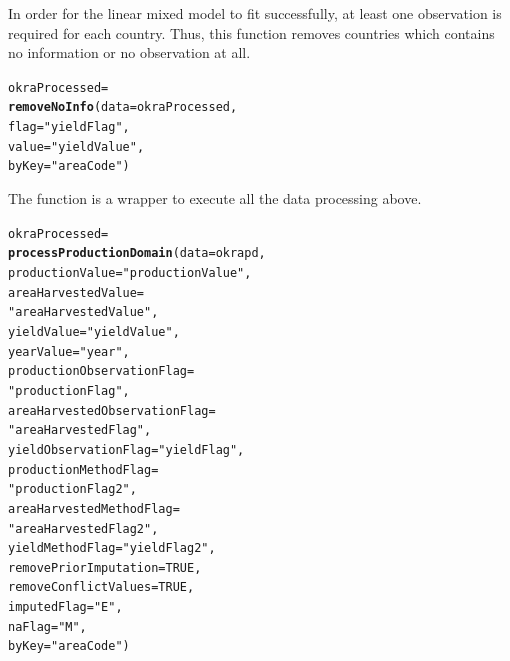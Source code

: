 \documentclass[nojss]{jss}\usepackage[]{graphicx}\usepackage[]{color}
\makeatletter
\newcommand{\hlnum}[1]{\textcolor[rgb]{0.686,0.059,0.569}{#1}}%
\newcommand{\hlstr}[1]{\textcolor[rgb]{0.192,0.494,0.8}{#1}}%
\newcommand{\hlstd}[1]{\textcolor[rgb]{0.345,0.345,0.345}{#1}}%
\newcommand{\hlkwb}[1]{\textcolor[rgb]{0.69,0.353,0.396}{#1}}%
\newcommand{\hlkwc}[1]{\textcolor[rgb]{0.333,0.667,0.333}{#1}}%
\newcommand{\hlkwd}[1]{\textcolor[rgb]{0.737,0.353,0.396}{\textbf{#1}}}%
\newenvironment{kframe}{%
 \def\at@end@of@kframe{}%
 \ifinner\ifhmode%
  \def\at@end@of@kframe{\end{minipage}}%
  \begin{minipage}{\columnwidth}%
 \fi\fi%
 \def\FrameCommand##1{\hskip\@totalleftmargin \hskip-\fboxsep
 \colorbox{shadecolor}{##1}\hskip-\fboxsep
     \hskip-\linewidth \hskip-\@totalleftmargin \hskip\columnwidth}%
 \MakeFramed {\advance\hsize-\width
   \@totalleftmargin\z@ \linewidth\hsize
   \@setminipage}}%
 {\par\unskip\endMakeFramed%
 \at@end@of@kframe}
\newenvironment{knitrout}{}{} %
\makeatother
\begin{document}
In order for the linear mixed model to fit successfully, at least one
observation is required for each country. Thus, this function removes
countries which contains no information or no observation at all.

\begin{knitrout}
\color{fgcolor}\begin{kframe}
\begin{alltt}
\hlstd{okraProcessed} \hlkwb{=}
    \hlkwd{removeNoInfo}\hlstd{(}\hlkwc{data} \hlstd{= okraProcessed,}
                 \hlkwc{flag} \hlstd{=} \hlstr{"yieldFlag"}\hlstd{,}
                 \hlkwc{value} \hlstd{=} \hlstr{"yieldValue"}\hlstd{,}
                 \hlkwc{byKey} \hlstd{=} \hlstr{"areaCode"}\hlstd{)}
\end{alltt}
\end{kframe}
\end{knitrout}


The function  is a wrapper to execute
all the data processing above.

\begin{knitrout}
\color{fgcolor}\begin{kframe}
\begin{alltt}
\hlstd{okraProcessed} \hlkwb{=}
    \hlkwd{processProductionDomain}\hlstd{(}\hlkwc{data} \hlstd{= okrapd,}
                           \hlkwc{productionValue} \hlstd{=} \hlstr{"productionValue"}\hlstd{,}
                           \hlkwc{areaHarvestedValue} \hlstd{=}
                               \hlstr{"areaHarvestedValue"}\hlstd{,}
                           \hlkwc{yieldValue} \hlstd{=} \hlstr{"yieldValue"}\hlstd{,}
                           \hlkwc{yearValue} \hlstd{=} \hlstr{"year"}\hlstd{,}
                           \hlkwc{productionObservationFlag} \hlstd{=}
                               \hlstr{"productionFlag"}\hlstd{,}
                           \hlkwc{areaHarvestedObservationFlag} \hlstd{=}
                               \hlstr{"areaHarvestedFlag"}\hlstd{,}
                           \hlkwc{yieldObservationFlag} \hlstd{=} \hlstr{"yieldFlag"}\hlstd{,}
                           \hlkwc{productionMethodFlag} \hlstd{=}
                               \hlstr{"productionFlag2"}\hlstd{,}
                           \hlkwc{areaHarvestedMethodFlag} \hlstd{=}
                               \hlstr{"areaHarvestedFlag2"}\hlstd{,}
                           \hlkwc{yieldMethodFlag} \hlstd{=} \hlstr{"yieldFlag2"}\hlstd{,}
                           \hlkwc{removePriorImputation} \hlstd{=} \hlnum{TRUE}\hlstd{,}
                           \hlkwc{removeConflictValues} \hlstd{=} \hlnum{TRUE}\hlstd{,}
                           \hlkwc{imputedFlag} \hlstd{=} \hlstr{"E"}\hlstd{,}
                           \hlkwc{naFlag} \hlstd{=} \hlstr{"M"}\hlstd{,}
                           \hlkwc{byKey} \hlstd{=} \hlstr{"areaCode"}\hlstd{)}
\end{alltt}
\end{kframe}
\end{knitrout}
\end{document}
